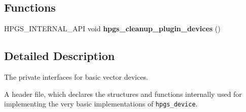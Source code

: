 \subsection*{Functions}
\begin{CompactItemize}
\item 
HPGS\_\-INTERNAL\_\-API void \textbf{hpgs\_\-cleanup\_\-plugin\_\-devices} ()\label{group__device_ge99c6a46a83f5dc00f3e9cc3420356fb}

\end{CompactItemize}


\subsection{Detailed Description}
The private interfaces for basic vector devices. 

A header file, which declares the structures and functions internally used for implementing the very basic implementations of {\tt hpgs\_\-device}. 